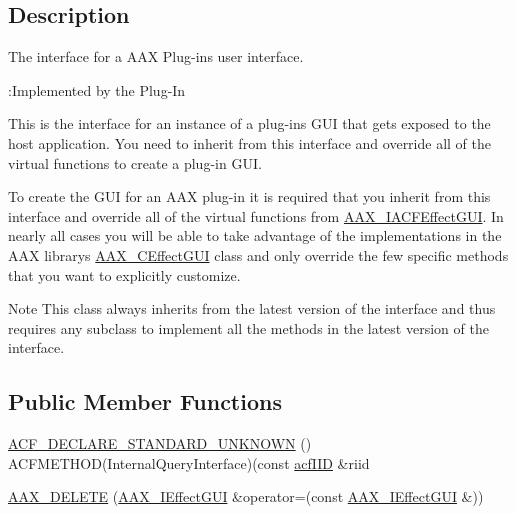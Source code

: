 \subsection{Description}
The interface for a A\+AX Plug-\/in\textquotesingle{}s user interface. 

\begin{DoxyRefDesc}{\+:\+Implemented by the Plug-\/\+In}
\item[\mbox{\hyperlink{a00791__aax_plugin_implementation000002}{\+:\+Implemented by the Plug-\/\+In}}]\end{DoxyRefDesc}


This is the interface for an instance of a plug-\/in\textquotesingle{}s G\+UI that gets exposed to the host application. You need to inherit from this interface and override all of the virtual functions to create a plug-\/in G\+UI.

To create the G\+UI for an A\+AX plug-\/in it is required that you inherit from this interface and override all of the virtual functions from \mbox{\hyperlink{a01665}{A\+A\+X\+\_\+\+I\+A\+C\+F\+Effect\+G\+UI}}. In nearly all cases you will be able to take advantage of the implementations in the A\+AX library\textquotesingle{}s \mbox{\hyperlink{a01477}{A\+A\+X\+\_\+\+C\+Effect\+G\+UI}} class and only override the few specific methods that you want to explicitly customize.

\begin{DoxyNote}{Note}
This class always inherits from the latest version of the interface and thus requires any subclass to implement all the methods in the latest version of the interface. 
\end{DoxyNote}
\subsection*{Public Member Functions}
\begin{DoxyCompactItemize}
\item 
\mbox{\hyperlink{a01821_a8b48b2f7798aa1ad2ebb38a93ad409b9}{A\+C\+F\+\_\+\+D\+E\+C\+L\+A\+R\+E\+\_\+\+S\+T\+A\+N\+D\+A\+R\+D\+\_\+\+U\+N\+K\+N\+O\+WN}} () A\+C\+F\+M\+E\+T\+H\+OD(Internal\+Query\+Interface)(const \mbox{\hyperlink{a00269_a59df0b41744eee7a066787aaedf97f67}{acf\+I\+ID}} \&riid
\item 
\mbox{\hyperlink{a01821_abee8b669ca6136a80364127f144d24c3}{A\+A\+X\+\_\+\+D\+E\+L\+E\+TE}} (\mbox{\hyperlink{a01821}{A\+A\+X\+\_\+\+I\+Effect\+G\+UI}} \&operator=(const \mbox{\hyperlink{a01821}{A\+A\+X\+\_\+\+I\+Effect\+G\+UI}} \&))
\end{DoxyCompactItemize}
